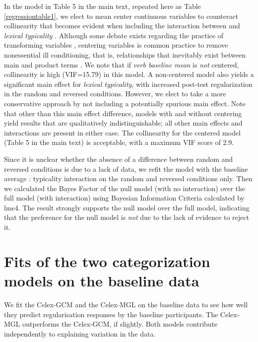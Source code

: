 \documentclass[12pt]{article}
\begin{document}
In the model in Table 5 in the main text, repeated here as Table \ref{regressiontable1}, we elect to mean center continuous variables to counteract collinearity that becomes evident when including the interaction between and {\em lexical typicality} .  Although some debate exists regarding the practice of transforming variables \citep{belsley1991conditioning,echambadi2007mean}, centering variables is common practice to remove nonessential ill conditioning, that is, relationships that inevitably exist between main and product terms \citep{aiken1991multiple,jaccard2003interaction, jaeger2008categorical}. We note that if {\em verb baseline mean} is {\em not} centered, collinearity is high (VIF=15.79) in this model. A non-centered model also yields a significant main effect for {\em lexical typicality}, with increased post-test regularization in the random and reversed conditions. However, we elect to take a more conservative approach by not including a potentially spurious main effect. Note that other than this main effect difference, models with and without centering yield results that are qualitatively indistinguishable; all other main effects and interactions are present in either case. The collinearity for the centered model (Table 5 in the main text) is acceptable, with a maximum VIF score of 2.9.


Since it is unclear whether the absence of a difference between random and reversed conditions is due to a lack of data, we refit the model with the baseline average : typicality interaction on the random and reversed conditions only. Then we calculated the Bayes Factor of the null model (with no interaction) over the full model (with interaction) using Bayesian Information Criteria calculated by lme4. The result strongly supports the null model over the full model, indicating that the preference for the null model is {\em not} due to the lack of evidence to reject it.

\section{Fits of the two categorization models on the baseline data}\label{appendixgcmmglresidualization}

We fit the Celex-GCM and the Celex-MGL on the baseline data to see how well they predict regularisation responses by the baseline participants. The Celex-MGL outperforms the Celex-GCM, if slightly. Both models contribute independently to explaining variation in the data.
\end{document}
